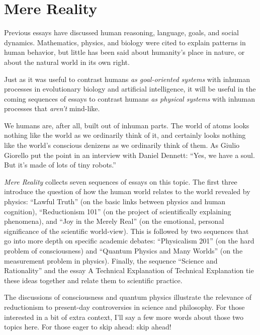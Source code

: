 \part{Mere Reality}



{
 Previous essays have discussed human reasoning, language, goals,
and social dynamics. Mathematics, physics, and biology were cited to
explain patterns in human behavior, but little has been said about
humanity's place in nature, or about the natural world
in its own right.}

{
 Just as it was useful to contrast humans \textit{as goal-oriented
systems} with inhuman processes in evolutionary biology and artificial
intelligence, it will be useful in the coming sequences of essays to
contrast humans \textit{as physical systems} with inhuman processes
that \textit{aren't} mind-like.}

{
 We humans are, after all, built out of inhuman parts. The world of
atoms looks nothing like the world as we ordinarily think of it, and
certainly looks nothing like the world's conscious
denizens as we ordinarily think of them. As Giulio Giorello put the
point in an interview with Daniel Dennett: ``Yes, we
have a soul. But it's made of lots of tiny
robots.''}

{
 \textit{Mere Reality} collects seven sequences of essays on this
topic. The first three introduce the question of how the human world
relates to the world revealed by physics: ``Lawful
Truth'' (on the basic links between physics and human
cognition), ``Reductionism 101'' (on
the project of scientifically explaining phenomena), and
``Joy in the Merely Real'' (on the
emotional, personal significance of the scientific world-view). This is
followed by two sequences that go into more depth on specific academic
debates: ``Physicalism 201'' (on the
hard problem of consciousness) and ``Quantum Physics
and Many Worlds'' (on the measurement problem in
physics). Finally, the sequence ``Science and
Rationality'' and the essay A Technical Explanation
of Technical Explanation tie these ideas together and relate them to
scientific practice.}

{
 The discussions of consciousness and quantum physics illustrate
the relevance of reductionism to present-day controversies in science
and philosophy. For those interested in a bit of extra context,
I'll say a few more words about those two topics here.
For those eager to skip ahead: skip ahead!}

